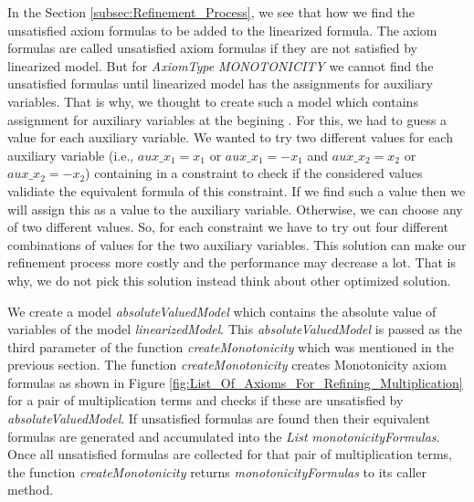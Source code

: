 \noindent In the Section \ref{subsec:Refinement_Process}, we see that how we find the unsatisfied axiom formulas to be added to the linearized formula.
The axiom formulas are called unsatisfied axiom formulas if they are not satisfied by linearized model.
But for \textit{AxiomType} \textit{MONOTONICITY} we cannot find the unsatisfied formulas until linearized model has the assignments for auxiliary variables.
That is why, we thought to create such a model which contains assignment for auxiliary variables  at the begining .
For this, we had to guess a value for each auxiliary variable.
We wanted to try two different values for each auxiliary variable (i.e., $aux\_x_{1} = x_{1}$ or $aux\_x_{1} = -x_{1}$ and $aux\_x_{2} = x_{2}$ or $aux\_x_{2} = -x_{2}$) containing in a constraint to check if the considered values validiate the equivalent formula of this constraint.
If we find such a value then we will assign this as a value to the auxiliary variable.
Otherwise, we can choose any of two different values.
So, for each constraint we have to try out four different combinations of values for the two auxiliary variables.
This solution can make our refinement process more costly and the performance may decrease a lot.
That is why, we do not pick this solution instead think about other optimized solution.\newline

\noindent We create a model \textit{absoluteValuedModel} which contains the absolute value of variables of the model \textit{linearizedModel}.
This \textit{absoluteValuedModel} is passed as the third parameter of the function \textit{createMonotonicity} which was mentioned in the previous section.
The function \textit{createMonotonicity} creates Monotonicity axiom formulas as shown in Figure \ref{fig:List_Of_Axioms_For_Refining_Multiplication} for a pair of multiplication terms and checks if these are unsatisfied by \textit{absoluteValuedModel}.
If unsatisfied formulas are found then their equivalent formulas are generated and accumulated into the \textit{List} \textit{monotonicityFormulas}.
Once all unsatisfied formulas are collected for that pair of multiplication terms, the function \textit{createMonotonicity} returns \textit{monotonicityFormulas} to its caller method.

